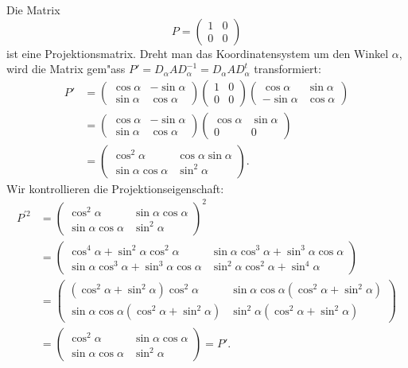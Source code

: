 \begin{beispiel}
Die Matrix
\[
P=\begin{pmatrix}1&0\\0&0\end{pmatrix}
\]
ist eine Projektionsmatrix.
Dreht man das Koordinatensystem um den Winkel $\alpha$, wird die Matrix 
gem"ass $P'=D_\alpha AD_\alpha ^{-1}=D_\alpha AD_\alpha^t$ transformiert:
\begin{align*}
P'&=
\begin{pmatrix}\cos\alpha&-\sin\alpha\\\sin\alpha&\cos\alpha\end{pmatrix}
\begin{pmatrix}1&0\\0&0\end{pmatrix}
\begin{pmatrix}\cos\alpha&\sin\alpha\\-\sin\alpha&\cos\alpha\end{pmatrix}
\\
&=
\begin{pmatrix}\cos\alpha&-\sin\alpha\\\sin\alpha&\cos\alpha\end{pmatrix}
\begin{pmatrix}\cos\alpha&\sin\alpha\\0&0\end{pmatrix}
\\
&=
\begin{pmatrix}\cos^2\alpha&\cos\alpha\sin\alpha\\\sin\alpha\cos\alpha&\sin^2\alpha\end{pmatrix}.
\end{align*}
Wir kontrollieren die Projektionseigenschaft:
\begin{align*}
P^{\prime 2}
&=
\begin{pmatrix}
\cos^2\alpha
	&\sin\alpha\cos\alpha\\
\sin\alpha\cos\alpha
	&\sin^2\alpha
\end{pmatrix}^2
\\
&=
\begin{pmatrix}
\cos^4\alpha + \sin^2\alpha\cos^2\alpha
	&\sin\alpha\cos^3\alpha+\sin^3\alpha\cos\alpha\\
\sin\alpha\cos^3\alpha+\sin^3\alpha\cos\alpha
	&\sin^2\alpha\cos^2\alpha+\sin^4\alpha
\end{pmatrix}
\\
&=
\begin{pmatrix}
(\cos^2\alpha + \sin^2\alpha)\cos^2\alpha
	&\sin\alpha\cos\alpha(\cos^2\alpha+\sin^2\alpha)\\
\sin\alpha\cos\alpha(\cos^2\alpha+\sin^2\alpha)
	&\sin^2\alpha(\cos^2\alpha+\sin^2\alpha)
\end{pmatrix}
\\
&=
\begin{pmatrix}
\cos^2\alpha
	&\sin\alpha\cos\alpha\\
\sin\alpha\cos\alpha
	&\sin^2\alpha
\end{pmatrix}=P'.
\end{align*}
\end{beispiel}

